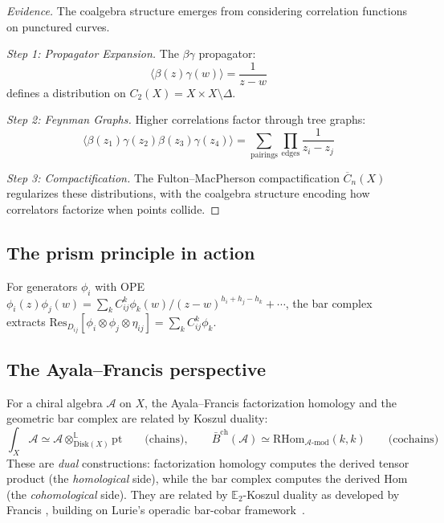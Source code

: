 \begin{proof}[Evidence]
The coalgebra structure emerges from considering correlation functions on punctured curves.

\emph{Step 1: Propagator Expansion.} The $\beta\gamma$ propagator:
\[
\langle \beta(z)\gamma(w) \rangle = \frac{1}{z-w}
\]
defines a distribution on $C_2(X) = X \times X \setminus \Delta$.

\emph{Step 2: Feynman Graphs.} Higher correlations factor through tree graphs:
\[
\langle \beta(z_1)\gamma(z_2)\beta(z_3)\gamma(z_4) \rangle = 
\sum_{\text{pairings}} \prod_{\text{edges}} \frac{1}{z_i - z_j}
\]

\emph{Step 3: Compactification.} The Fulton--MacPherson compactification $\overline{C}_n(X)$ 
regularizes these distributions, with the coalgebra structure encoding how correlators 
factorize when points collide.
\end{proof}

\subsection{The prism principle in action}

\begin{example}
For generators $\phi_i$ with OPE $\phi_i(z) \phi_j(w) = \sum_k C_{ij}^k \phi_k(w)/(z-w)^{h_i + h_j - h_k} + \cdots$, the bar complex extracts $\mathrm{Res}_{D_{ij}}[\phi_i \otimes \phi_j \otimes \eta_{ij}] = \sum_k C_{ij}^k \phi_k$.
\end{example}

\subsection{The Ayala--Francis perspective}

\begin{theorem}\label{thm:fact-homology-quantum}
For a chiral algebra $\mathcal{A}$ on $X$, the Ayala--Francis factorization homology and the geometric bar complex are related by Koszul duality:
\[\int_X \mathcal{A} \simeq \mathcal{A} \otimes^{\mathbb{L}}_{\mathrm{Disk}(X)} \mathrm{pt} \qquad \text{(chains)}, \qquad \bar{B}^{\mathrm{ch}}(\mathcal{A}) \simeq \mathrm{RHom}_{\mathcal{A}\text{-mod}}(k, k) \qquad \text{(cochains)}\]
These are \emph{dual} constructions: factorization homology computes the derived tensor product (the \emph{homological} side), while the bar complex computes the derived Hom (the \emph{cohomological} side). They are related by $\mathbb{E}_2$-Koszul duality as developed by Francis \cite{Francis2013}, building on Lurie's operadic bar-cobar framework~\cite[§5.2]{HA}.
\end{theorem}

